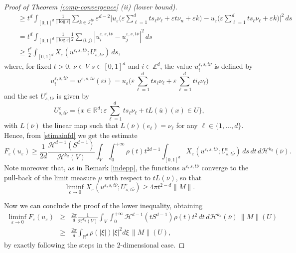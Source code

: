 \documentclass[10pt,a4paper]{amsart}
\def\e{\varepsilon}
\begin{document}
\begin{proof}[Proof of Theorem {\rm\ref{comp-convergence}} {\rm (ii)} (lower bound)]
\begin{eqnarray*}
&&\geq t^d \int_{[0,1]^d} \frac{1}{|\log\e|}\sum_{k\in \mathcal I_\e^{t\overline \nu}} \e^{d-2} 
\Big|u_\e\Big(\e \sum_{\ell=1}^d t s_\ell\nu_\ell +\e t\nu_n +\e k\Big)-u_\e\Big(\e \sum_{\ell=1}^d t s_\ell\nu_\ell +\e k\Big)\Big|^2\, ds\\
&&=t^d \int_{[0,1]^d} \frac{1}{|\log\e|} \frac{1}{2}\sum_{\langle i, j \rangle} |u_i^{\e, s, t\overline \nu}-u_j^{\e, s, t\overline \nu}|^2 \, ds\\
&&\geq \frac{t^d}{2} \int_{[0,1]^d} X_\e(u^{\e,s, t\overline \nu}; U^\e_{s,t\overline\nu}) \, ds, 
\end{eqnarray*} 
where, for fixed $t>0$, $\overline \nu\in V$ $s\in[0,1]^d$ and $i\in\mathbb Z^d$, the value $u^{\e,s,t\overline \nu}_i$ is defined 
by
\begin{equation}\label{uexizd}
u^{\e,s,t\overline \nu}_i=u^{\e,s,t\overline \nu}(\e i)=u_\e\bigg(\e\sum_{\ell=1}^d t s_\ell\nu_\ell 
+\e \sum_{\ell=1}^d t i_\ell \nu_\ell\bigg)
\end{equation} 
and the set $U^\e_{s,t\overline \nu}$ is given by 
$$U^\e_{s,t\overline \nu}=\Big\{x\in\mathbb R^d: \e\sum_{\ell=1}^d t s_\ell \nu_\ell+t L(\overline u)(x)\in U\Big\},$$ 
with $L(\overline \nu)$ the linear map such that $L(\overline \nu)(e_\ell)=\nu_\ell$ for any $
\ell\in\{1,\dots, d\}$. 
Hence, from \eqref{stimainfd} we get the estimate 
\begin{equation}\label{stimainfd2}
F_\e(u_\e)\geq \frac{1}{2d}\frac{\mathcal H^{d-1}(S^{d-1})}{\mathcal H^{k_d}(V)} 
\int_{V}\int_0^{+\infty} \rho(t) t^{2d-1} \int_{[0,1]^d} X_\e(u^{\e,s, t\overline \nu}; U^\e_{s,t\overline\nu}) \, ds   \, dt\, d\mathcal H^{k_d}(\overline \nu).  
\end{equation}
Note moreover that, as in Remark \ref{indepp}, the functions $u^{\e,s,t \overline \nu}$ converge to the pull-back of the limit measure $\mu$ with respect to $t L(\overline \nu)$, so that 
$$\liminf_{\e\to 0} X_\e (u^{\e,s,t\overline \nu}; U^\e_{s,t\overline \nu})\geq 4\pi t^{2-d}\|M\|.$$


Now we can conclude the proof of the lower inequality, obtaining 
\begin{eqnarray*}
\liminf_{\e\to 0}F_\e(u_\e)&\geq& 
\frac{2\pi}{d}\frac{1}{\mathcal H^{k_d}(V)} 
\int_{V}
\int_0^{+\infty} \mathcal H^{d-1}(t S^{d-1}) \rho(t) t^{2}    \, dt\, d\mathcal H^{k_d}(\overline \nu)\ \|M\|(U)
\\
&\geq&  \frac{2\pi}{d}\int_{\mathbb R^d}\rho(|\xi|)|\xi|^2d\xi\,  \|M\|(U),
\end{eqnarray*} 
by exactly following the steps in the $2$-dimensional case. 
\end{proof}
\end{document}

